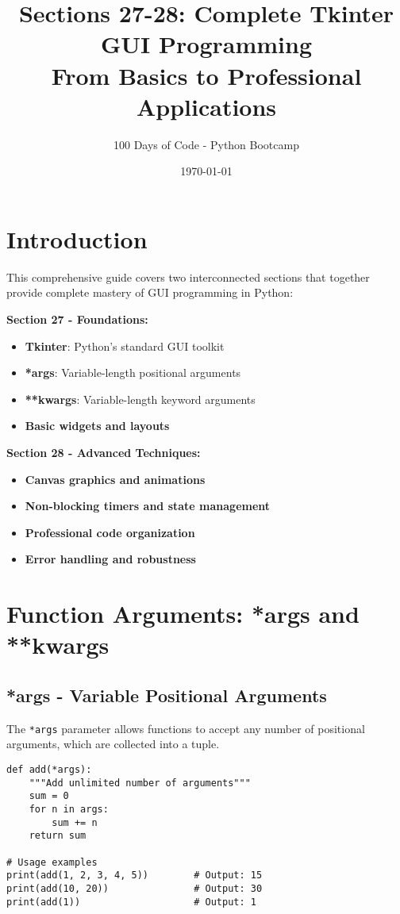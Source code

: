 \documentclass[12pt,a4paper]{article}
\title{\textbf{Sections 27-28: Complete Tkinter GUI Programming}\\
\large{From Basics to Professional Applications}}
\author{100 Days of Code - Python Bootcamp}
\date{\today}
\begin{document}
\maketitle
\newpage

\tableofcontents
\newpage

\section{Introduction}

This comprehensive guide covers two interconnected sections that together provide complete mastery of GUI programming in Python:

\textbf{Section 27 - Foundations:}
\begin{itemize}
    \item \textbf{Tkinter}: Python's standard GUI toolkit
    \item \textbf{*args}: Variable-length positional arguments
    \item \textbf{**kwargs}: Variable-length keyword arguments
    \item \textbf{Basic widgets and layouts}
\end{itemize}

\textbf{Section 28 - Advanced Techniques:}
\begin{itemize}
    \item \textbf{Canvas graphics and animations}
    \item \textbf{Non-blocking timers and state management}
    \item \textbf{Professional code organization}
    \item \textbf{Error handling and robustness}
\end{itemize}

\section{Function Arguments: *args and **kwargs}

\subsection{*args - Variable Positional Arguments}

The \texttt{*args} parameter allows functions to accept any number of positional arguments, which are collected into a tuple.

\begin{tcolorbox}[colback=blue!5!white,colframe=blue!75!black,title=*args Example]
\begin{lstlisting}
def add(*args):
    """Add unlimited number of arguments"""
    sum = 0
    for n in args:
        sum += n
    return sum

# Usage examples
print(add(1, 2, 3, 4, 5))        # Output: 15
print(add(10, 20))               # Output: 30
print(add(1))                    # Output: 1
\end{lstlisting}
\end{tcolorbox}
\end{document}
